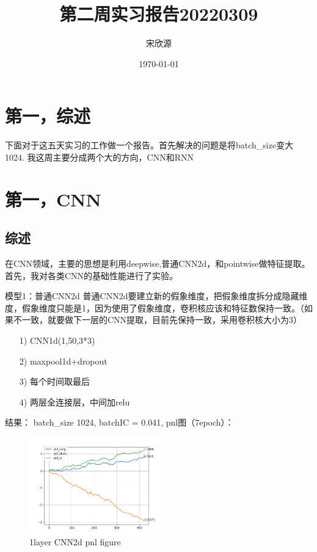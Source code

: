 \documentclass[11pt]{ctexart}
\begin{document}
\title{第二周实习报告20220309}
\author{宋欣源}
\date{\today}

\maketitle %


\section{第一，综述}

下面对于这五天实习的工作做一个报告。首先解决的问题是将batch\_size变大1024.
我这周主要分成两个大的方向，CNN和RNN

\section{第一，CNN}
\subsection{综述}
在CNN领域，主要的思想是利用deepwise,普通CNN2d，和pointwise做特征提取。首先，我对各类CNN的基础性能进行了实验。

模型1：普通CNN2d
普通CNN2d要建立新的假象维度，把假象维度拆分成隐藏维度，假象维度只能是1，因为使用了假象维度，卷积核应该和特征数保持一致。（如果不一致，就要做下一层的CNN提取，目前先保持一致，采用卷积核大小为3）
\begin{itemize}
  \item [1)]
  CNN1d(1,50,3*3)
  \item [2)]
  maxpool1d+dropout
  \item [3)]
  每个时间取最后
  \item [4)]
  两层全连接层，中间加relu

\end{itemize}
结果： batch\_size 1024, batchIC = 0.041,
pnl图（7epoch）：
\begin{figure}[!ht]
\begin{center}
\includegraphics[width=0.5\textwidth]{4.PNG}
\end{center}
\caption{1layer CNN2d pnl figure}
\label{FIG.1}
\end{figure}
\end{document}
